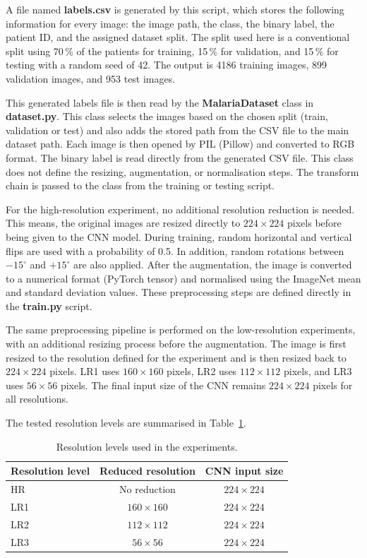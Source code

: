A file named \textbf{labels.csv} is generated by this script, which stores  the following information for every image: the image path, the class, the binary label, the patient ID, and the assigned dataset split. The split used here is a conventional split using 70\,\% of the patients for training, 15\,\% for validation, and 15\,\% for testing with a random seed of 42. The output is 4186 training images, 899 validation images, and 953 test images.

This generated labels file is then read by the \textbf{MalariaDataset} class in \textbf{dataset.py}. This class selects the images based on the chosen split (train, validation or test) and also adds the stored path from the CSV file to the main dataset path. Each image is then opened by PIL (Pillow) and converted to RGB format. The binary label is read directly from the generated CSV file. This class does not define the resizing, augmentation, or normalisation steps. The transform chain is passed to the class from the training or testing script.

For the high-resolution experiment, no additional resolution reduction is needed. This means, the original images are resized directly to \(224 \times 224\) pixels before being given to the CNN model. During training, random horizontal and vertical flips are used with a probability of 0.5. In addition, random rotations between \(-15^\circ\) and \(+15^\circ\) are also applied. After the augmentation, the image is converted to a numerical format (PyTorch tensor) and normalised using the ImageNet mean and standard deviation values. These preprocessing steps are defined directly in the \textbf{train.py} script.

The same preprocessing pipeline is performed on the low-resolution experiments, with an additional resizing process before the augmentation. The image is first resized to the resolution defined for the experiment and is then resized back to \(224 \times 224\) pixels. LR1 uses \(160 \times 160\) pixels, LR2 uses \(112 \times 112\) pixels, and LR3 uses \(56 \times 56\) pixels. The final input size of the CNN remains \(224 \times 224\) pixels for all resolutions.

The tested resolution levels are summarised in Table~\ref{tab:resolution_levels}.

\begin{table}[htbp]
    \centering
    \caption{Resolution levels used in the experiments.}
    \label{tab:resolution_levels}
    \begin{tabular}{|l|c|c|}
        \hline
        \textbf{Resolution level} & \textbf{Reduced resolution} & \textbf{CNN input size} \\ \hline
        HR  &  No reduction
        & \(224 \times 224\) \\ \hline
        LR1 & \(160 \times 160\) & \(224 \times 224\) \\ \hline
        LR2 & \(112 \times 112\) & \(224 \times 224\) \\ \hline
        LR3 & \(56 \times 56\) & \(224 \times 224\) \\ \hline
    \end{tabular}
\end{table}

